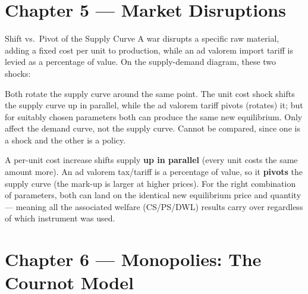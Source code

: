 \section{Chapter 5 — Market Disruptions}

\begin{question}[type=mc]{Shift vs.\ Pivot of the Supply Curve}
A war disrupts a specific raw material, adding a fixed cost per unit to
production, while an ad valorem import tariff is levied as a percentage of
value. On the supply-demand diagram, these two shocks:
\begin{choices}
  \choice        Both rotate the supply curve around the same point.
  \correctchoice The unit cost shock shifts the supply curve up in parallel,
                 while the ad valorem tariff pivots (rotates) it; but for
                 suitably chosen parameters both can produce the same new
                 equilibrium.
  \choice        Only affect the demand curve, not the supply curve.
  \choice        Cannot be compared, since one is a shock and the other is a
                 policy.
\end{choices}
\begin{solution}
  A per-unit cost increase shifts supply \textbf{up in parallel} (every unit
  costs the same amount more). An ad valorem tax/tariff is a percentage of
  value, so it \textbf{pivots} the supply curve (the mark-up is larger at
  higher prices). For the right combination of parameters, both can land on
  the identical new equilibrium price and quantity — meaning all the
  associated welfare (CS/PS/DWL) results carry over regardless of which
  instrument was used.
\end{solution}
\end{question}


\section{Chapter 6 — Monopolies: The Cournot Model}

